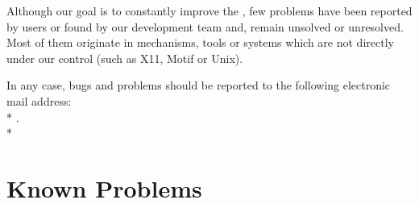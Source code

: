 Although our goal is to constantly improve the \COPRSDE, few problems
have been reported by users or found by our development team and, remain
unsolved or unresolved. Most of them originate in mechanisms, tools or
systems which are not directly under our control (such as X11, Motif or
Unix).

In any case, bugs and problems should be reported to the following electronic
mail address:\\*
.\\*




\section{Known Problems}


